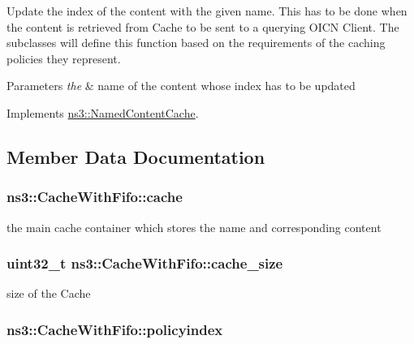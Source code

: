Update the index of the content with the given name. This has to be done when the content is retrieved from Cache to be sent to a querying O\-I\-C\-N Client. The subclasses will define this function based on the requirements of the caching policies they represent. 


\begin{DoxyParams}{Parameters}
{\em the} & name of the content whose index has to be updated \\
\hline
\end{DoxyParams}


Implements \hyperlink{classns3_1_1NamedContentCache_aeabf8afacd89cbc46b78b382c8a487e8}{ns3\-::\-Named\-Content\-Cache}.



\subsection{Member Data Documentation}
\hypertarget{classns3_1_1CacheWithFifo_a0156478153f80ff4c9980c8ad41a5c6e}{
\subsubsection[{cache}]{ ns3\-::\-Cache\-With\-Fifo\-::cache\hspace{0.3cm}{\ttfamily [private]}}}\label{classns3_1_1CacheWithFifo_a0156478153f80ff4c9980c8ad41a5c6e}


the main cache container which stores the name and corresponding content 

\hypertarget{classns3_1_1CacheWithFifo_a73682581680dbb344b2d39fcec84d22a}{
\subsubsection[{cache\-\_\-size}]{\setlength{\rightskip}{0pt plus 5cm}uint32\-\_\-t ns3\-::\-Cache\-With\-Fifo\-::cache\-\_\-size\hspace{0.3cm}{\ttfamily [private]}}}\label{classns3_1_1CacheWithFifo_a73682581680dbb344b2d39fcec84d22a}


size of the Cache 

\hypertarget{classns3_1_1CacheWithFifo_a6eac664460d6029cebf941cd42097d0b}{
\subsubsection[{policyindex}]{ ns3\-::\-Cache\-With\-Fifo\-::policyindex\hspace{0.3cm}{\ttfamily [private]}}}\label{classns3_1_1CacheWithFifo_a6eac664460d6029cebf941cd42097d0b}


